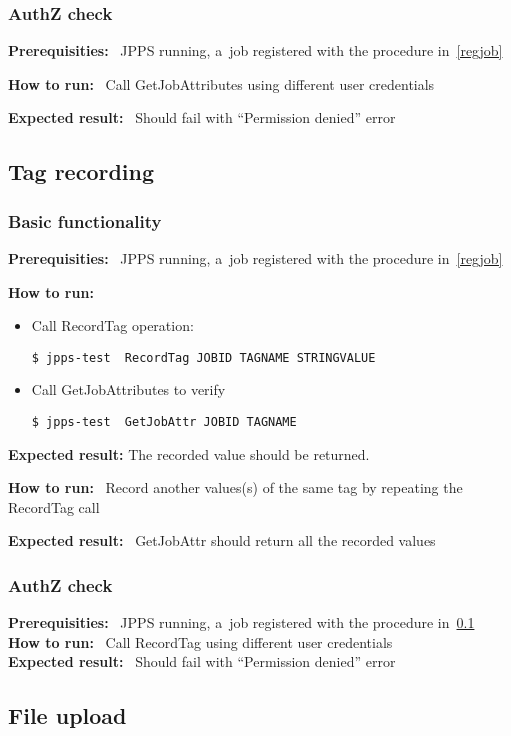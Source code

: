 \documentclass{egee}
\def\req{\noindent\textbf{Prerequisities: }}
\def\how{\noindent\textbf{How to run: }}
\def\result{\noindent\textbf{Expected result: }}
\begin{document}
\subsubsection{AuthZ check}
\req\ JPPS running, a~job registered with the procedure in~\ref{regjob}

\how\ 
Call GetJobAttributes using different user credentials 

\result\ 
Should fail with ``Permission denied'' error

\subsection{Tag recording}
\label{tagreg}

\subsubsection{Basic functionality}
\req\
JPPS running, a~job registered with the procedure in~\ref{regjob}

\how 
\begin{itemize}
\item Call RecordTag operation:
\begin{verbatim}
$ jpps-test  RecordTag JOBID TAGNAME STRINGVALUE
\end{verbatim}
\item Call GetJobAttributes to verify
\begin{verbatim}
$ jpps-test  GetJobAttr JOBID TAGNAME
\end{verbatim}
\end{itemize}
\result
The recorded value should be returned.

\how\ Record another values(s) of the same tag by repeating the RecordTag call

\result\ GetJobAttr should return all the recorded values


\subsubsection{AuthZ check}
\req\ JPPS running, a~job registered with the procedure in~\ref{tagreg} \\
\how\ Call RecordTag using different user credentials \\
\result\ Should fail with ``Permission denied'' error \\


\subsection{File upload}
\end{document}
